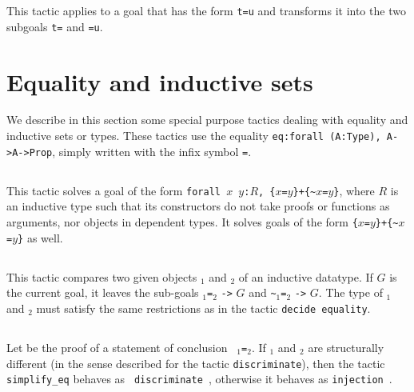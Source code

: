 This tactic applies to a goal that has the form {\tt t=u}
and transforms it into the two subgoals
{\tt t={\term}} and {\tt {\term}=u}.

\section{Equality and inductive sets}

We describe in this section some special purpose tactics dealing with
equality and inductive sets or types. These tactics use the equality
{\tt eq:forall (A:Type), A->A->Prop}, simply written with the
infix symbol {\tt =}.

\subsection{}
\label{decideequality}

This tactic solves a goal of the form
{\tt forall $x$ $y$:$R$, \{$x$=$y$\}+\{\verb|~|$x$=$y$\}}, where $R$
is an inductive type such that its constructors do not take proofs or
functions as arguments, nor objects in dependent types.
It solves goals of the form {\tt \{$x$=$y$\}+\{\verb|~|$x$=$y$\}} as well.

\subsection{}

This tactic compares two given objects \term$_1$ and \term$_2$
of an inductive datatype. If $G$ is the current goal, it leaves the sub-goals
\term$_1${\tt =}\term$_2$ {\tt ->} $G$ and \verb|~|\term$_1${\tt =}\term$_2$
{\tt ->} $G$. The type
of \term$_1$ and \term$_2$ must satisfy the same restrictions as in the tactic
\texttt{decide equality}.

\subsection{}
\label{simplify-eq}

Let {\term} be the proof of a statement of conclusion {\tt
  {\term$_1$}={\term$_2$}}. If {\term$_1$} and
{\term$_2$} are structurally different (in the sense described for the
tactic {\tt discriminate}), then the tactic {\tt simplify\_eq} behaves as {\tt
  discriminate {\term}}, otherwise it behaves as {\tt injection
  {\term}}.

